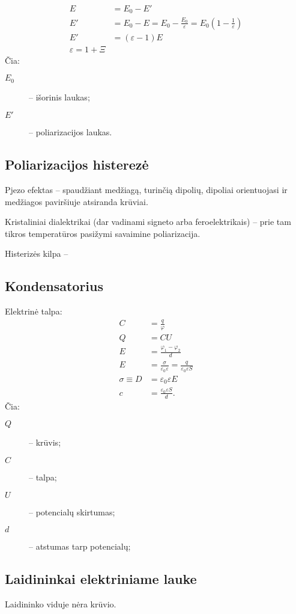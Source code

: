 \begin{align*}
  E &= E_{0} - E' \\
  E' &= E_{0} - E = E_{0} - \frac{E_{0}}{\varepsilon} 
  = E_{0} \left( 1 - \frac{1}{\varepsilon} \right) \\
  E' &= (\varepsilon - 1)E \\
  \varepsilon = 1 + \Xi
\end{align*}
Čia:
\begin{description}
  \item[$E_{0}$] – išorinis laukas;
  \item[$E'$] – poliarizacijos laukas.
\end{description}

\subsection{Poliarizacijos histerezė}

Pjezo efektas – spaudžiant medžiagą, turinčią dipolių, dipoliai
orientuojasi ir medžiagos paviršiuje atsiranda krūviai.

Kristaliniai dialektrikai (dar vadinami signeto arba feroelektrikais) – 
prie tam tikros temperatūros pasižymi savaimine poliarizacija.

Histerizės kilpa –

\subsection{Kondensatorius}

Elektrinė talpa:
\begin{align*}
  C &= \frac{q}{\varphi} \\
  Q &= CU \\
  E &= \frac{\varphi_{1} - \varphi_{2}}{d} \\
  E &= \frac{\sigma}{\varepsilon_{0}\varepsilon} = 
  \frac{q}{\varepsilon_{0}\varepsilon S} \\
  \sigma \equiv D &= \varepsilon_{0} \varepsilon E \\
  c &= \frac{\varepsilon_{0} \varepsilon S}{d}.
\end{align*}
Čia:
\begin{description}
  \item[$Q$] – krūvis;
  \item[$C$] – talpa;
  \item[$U$] – potencialų skirtumas;
  \item[$d$] – atstumas tarp potencialų;
\end{description}

\subsection{Laidininkai elektriniame lauke}

Laidininko viduje nėra krūvio.
